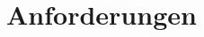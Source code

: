 \chapter{Anforderungen}
\label{sec:requirements_table}

\begin{figure*}[t]
    \centering
    
\end{figure*}
